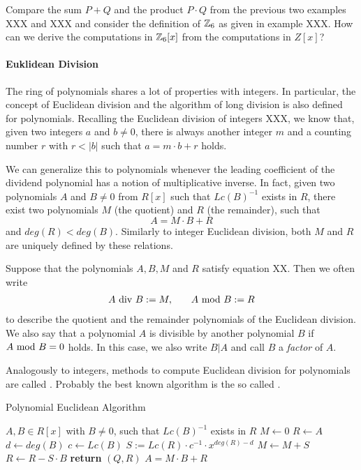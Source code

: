 \begin{exercise}
Compare the sum $P+Q$ and the product $P\cdot Q$ from the previous two examples XXX and XXX and consider the definition of $\mathbb{Z}_6$ as given in example XXX. How can we derive the computations in $\mathbb{Z}_6[x]$ from the computations in $Z[x]$? 
\end{exercise}
\paragraph{Euklidean Division}
The ring of polynomials shares a lot of properties with  integers. In particular, the concept of Euclidean division and the algorithm of long division is also defined for polynomials. Recalling the Euclidean division of integers XXX, we know that, given two integers $a$ and $b\neq 0$, there is always another integer $m$ and a counting number $r$ with $r<|b|$ such that $a = m\cdot b +r$ holds.

We can generalize this to polynomials whenever the leading coefficient of the dividend polynomial has a notion of multiplicative inverse. In fact, given two polynomials $A$ and $B\neq 0$ from $R[x]$ such that $Lc(B)^{-1}$ exists in $R$, there exist two polynomials $M$ (the quotient) and $R$ (the remainder), such that
\begin{equation}
A = M\cdot B + R
\end{equation}
and $deg(R) < deg(B)$. Similarly to integer Euclidean division, both $M$ and $R$ are uniquely defined by these relations. 
\begin{notation}
\label{eq_polynomial_euklidean_division_notation}
Suppose that the polynomials $ A, B, M $ and $ R $ satisfy equation XX. Then we often write 
\begin{equation}
\label{def_integer_division_and_modulus}
\begin{array}{lcr}
A \text{ div } B: = M, & & A \text{ mod } B: = R 
\end{array}
\end{equation}
to describe the quotient and the remainder polynomials of the Euclidean division. We also say that a polynomial $ A $ is divisible by another polynomial $ B $ if $ A \text{ mod } B = 0 $ holds. In this case, we also write $ B | A $ and call $B$ a \textit{factor} of $A$.
\end{notation}
Analogously to integers, methods to compute Euclidean division for polynomials are called . Probably the best known algorithm is the so called . 
\begin{algorithm}\caption{Polynomial Euclidean Algorithm}
\label{alg_ext_euclid_alg}
\begin{algorithmic}[0]
\Require $A,B \in R[x]$ with $B\neq 0$, such that $Lc(B)^{-1}$ exists in $R$
\State $M \gets 0$
\State $R \gets A$
\State $d \gets deg(B)$
\State $c \gets Lc(B)$
\State  $S := Lc(R)\cdot c^{-1}\cdot x^{deg(R)-d}$
\State $M \gets M + S$
\State $R \gets R - S\cdot B$
\EndWhile
\State \textbf{return} $(Q, R)$ 
\EndProcedure
\Ensure $ A=  M \cdot B + R$
\end{algorithmic}
\end{algorithm}

